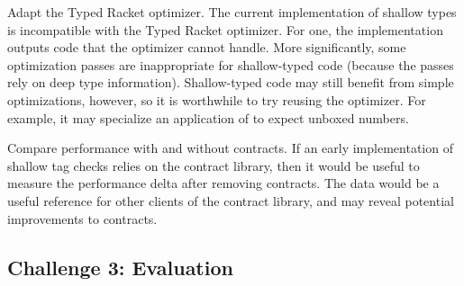 Adapt the Typed Racket optimizer.
The current implementation of shallow types is incompatible with the Typed
Racket optimizer.
For one, the implementation outputs code that the optimizer cannot handle.
More significantly, some optimization passes are inappropriate for shallow-typed
code (because the passes rely on deep type information).
Shallow-typed code may still benefit from simple optimizations, however,
so it is worthwhile to try reusing the optimizer.
For example, it may specialize an application of \racketcode{+} to expect unboxed numbers.

Compare performance with and without contracts.
If an early implementation of shallow tag checks relies on the contract library,
then it would be useful to measure the performance delta after removing contracts.
The data would be a useful reference for other clients of the contract library,
and may reveal potential improvements to contracts.


\subsection{Challenge 3: Evaluation}


